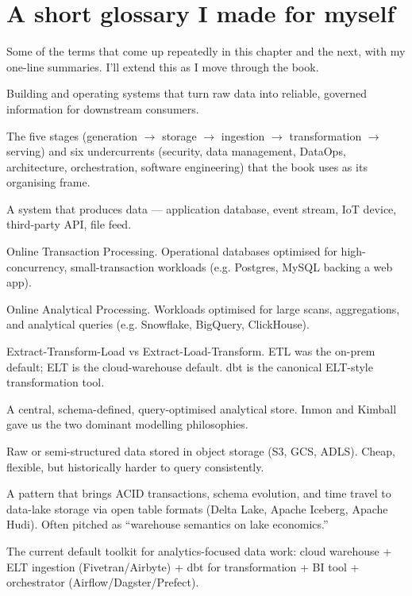 \section{A short glossary I made for myself}

Some of the terms that come up repeatedly in this chapter and the next, with my one-line summaries. I'll extend this as I move through the book.

\begin{description}[leftmargin=2cm, style=nextline]
  \item[Data engineering] Building and operating systems that turn raw data into reliable, governed information for downstream consumers.
  \item[Data engineering lifecycle] The five stages (generation $\to$ storage $\to$ ingestion $\to$ transformation $\to$ serving) and six undercurrents (security, data management, DataOps, architecture, orchestration, software engineering) that the book uses as its organising frame.
  \item[Source system] A system that produces data — application database, event stream, IoT device, third-party API, file feed.
  \item[OLTP] Online Transaction Processing. Operational databases optimised for high-concurrency, small-transaction workloads (e.g. Postgres, MySQL backing a web app).
  \item[OLAP] Online Analytical Processing. Workloads optimised for large scans, aggregations, and analytical queries (e.g. Snowflake, BigQuery, ClickHouse).
  \item[ETL / ELT] Extract-Transform-Load vs Extract-Load-Transform. ETL was the on-prem default; ELT is the cloud-warehouse default. dbt is the canonical ELT-style transformation tool.
  \item[Data warehouse] A central, schema-defined, query-optimised analytical store. Inmon and Kimball gave us the two dominant modelling philosophies.
  \item[Data lake] Raw or semi-structured data stored in object storage (S3, GCS, ADLS). Cheap, flexible, but historically harder to query consistently.
  \item[Lakehouse] A pattern that brings ACID transactions, schema evolution, and time travel to data-lake storage via open table formats (Delta Lake, Apache Iceberg, Apache Hudi). Often pitched as ``warehouse semantics on lake economics.''
  \item[Modern data stack] The current default toolkit for analytics-focused data work: cloud warehouse + ELT ingestion (Fivetran/Airbyte) + dbt for transformation + BI tool + orchestrator (Airflow/Dagster/Prefect).

\end{description}
